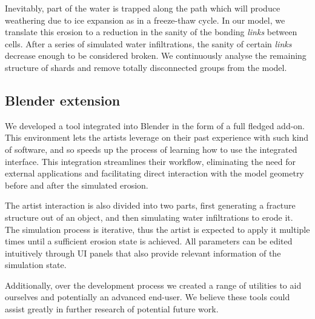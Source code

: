 \vspace{0.5\baselineskip}
Inevitably, part of the water is trapped along the path which will produce weathering due to ice expansion as in a freeze-thaw cycle. In our model, we translate this erosion to a reduction in the sanity of the bonding \textit{links} between cells. After a series of simulated water infiltrations, the sanity of certain \textit{links} decrease enough to be considered broken. We continuously analyse the remaining structure of shards and remove totally disconnected groups from the model.

\subsection{Blender extension}

We developed a tool integrated into Blender in the form of a full fledged add-on. This environment lets the artists leverage on their past experience with such kind of software, and so speeds up the process of learning how to use the integrated interface. This integration streamlines their workflow, eliminating the need for external applications and facilitating direct interaction with the model geometry before and after the simulated erosion.

\vspace{0.5\baselineskip}
The artist interaction is also divided into two parts, first generating a fracture structure out of an object, and then simulating water infiltrations to erode it. The simulation process is iterative, thus the artist is expected to apply it multiple times until a sufficient erosion state is achieved. All parameters can be edited intuitively through UI panels that also provide relevant information of the simulation state.

\vspace{0.5\baselineskip}
Additionally, over the development process we created a range of utilities to aid ourselves and potentially an advanced end-user. We believe these tools could assist greatly in further research of potential future work. 
